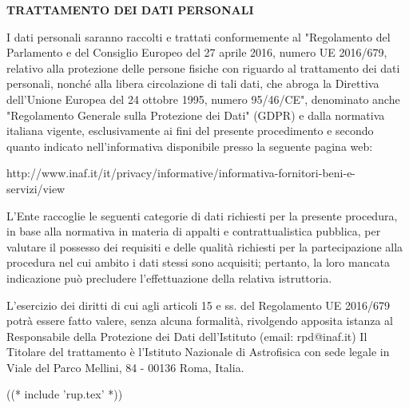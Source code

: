 \textbf{TRATTAMENTO DEI DATI PERSONALI}

I dati personali saranno raccolti e trattati conformemente al "Regolamento
del Parlamento e del Consiglio Europeo del 27 aprile 2016, numero UE
2016/679,  relativo alla protezione delle persone fisiche con riguardo
al trattamento dei dati personali, nonché alla libera circolazione
di tali dati, che abroga la Direttiva dell'Unione Europea del 24
ottobre 1995, numero 95/46/CE", denominato anche "Regolamento Generale
sulla Protezione dei Dati" (GDPR) e dalla normativa italiana vigente,
esclusivamente ai fini del presente procedimento e secondo quanto indicato
nell'informativa disponibile presso la seguente pagina web:

http://www.inaf.it/it/privacy/informative/informativa-fornitori-beni-e-servizi/view

L'Ente raccoglie le seguenti categorie di dati richiesti per la
presente procedura, in base alla normativa in materia di appalti
e contrattualistica pubblica, per valutare il possesso dei requisiti
e delle qualità richiesti per la partecipazione alla procedura nel cui
ambito i dati stessi sono acquisiti; pertanto, la loro mancata indicazione
può precludere l'effettuazione della relativa istruttoria.

L'esercizio dei diritti di cui agli articoli 15 e ss. del Regolamento UE
2016/679 potrà essere fatto valere, senza alcuna formalità, rivolgendo
apposita istanza al Responsabile della Protezione dei Dati dell'Istituto
(email: rpd@inaf.it) Il Titolare del trattamento è l'Istituto Nazionale
di Astrofisica con sede legale in Viale del Parco Mellini, 84 - 00136
Roma, Italia.

((* include 'rup.tex' *))

